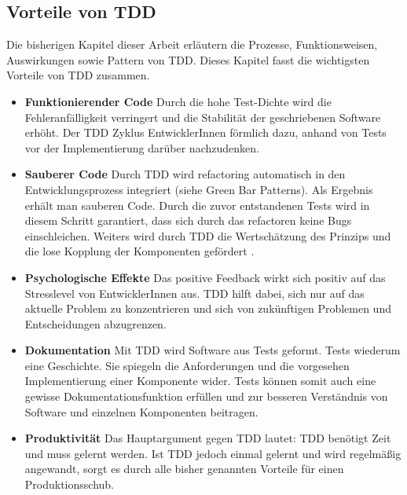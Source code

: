 {\subsection{Vorteile von TDD}
\label{Vorteile von TDD}
Die bisherigen Kapitel dieser Arbeit erläutern die Prozesse, Funktionsweisen, Auswirkungen sowie Pattern von TDD. Dieses Kapitel fasst die wichtigsten Vorteile von TDD zusammen.
\begin{itemize}
  \item \textbf{Funktionierender Code}\newline
  Durch die hohe Test-Dichte wird die Fehleranfälligkeit verringert und die Stabilität der geschriebenen Software erhöht. Der TDD Zyklus  EntwicklerInnen förmlich dazu, anhand von Tests vor der Implementierung darüber nachzudenken.
  \item \textbf{Sauberer Code}\newline
  Durch TDD wird refactoring automatisch in den Entwicklungsprozess integriert (siehe Green Bar Patterns). Als Ergebnis erhält man sauberen Code. Durch die zuvor entstandenen Tests wird in diesem Schritt garantiert, dass sich durch das refactoren keine Bugs einschleichen. Weiters wird durch TDD die Wertschätzung des  Prinzips und die lose Kopplung der Komponenten gefördert \autocite[30]{Johansen:2011}.
  \item \textbf{Psychologische Effekte}\newline
  Das positive Feedback wirkt sich positiv auf das Stresslevel von EntwicklerInnen aus.
  TDD hilft dabei, sich nur auf das aktuelle Problem zu konzentrieren und sich von zukünftigen Problemen und Entscheidungen abzugrenzen.
  \item \textbf{Dokumentation}\newline
  Mit TDD wird Software aus Tests geformt. Tests wiederum  eine Geschichte. Sie spiegeln die Anforderungen und die vorgesehen Implementierung einer Komponente wider. Tests können somit auch eine gewisse Dokumentationsfunktion erfüllen und zur besseren Verständnis von Software und einzelnen Komponenten beitragen.
  \item \textbf{Produktivität}\newline
  Das Hauptargument gegen TDD lautet: TDD benötigt Zeit und muss gelernt werden.
  Ist TDD jedoch einmal gelernt und wird regelmäßig angewandt, sorgt es durch alle bisher genannten Vorteile für einen Produktionsschub.
\end{itemize}

}
